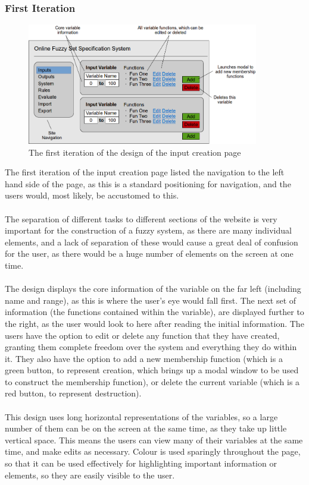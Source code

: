 \subsubsection{First Iteration}
\begin{figure}[ht!]
\begin{center}
\includegraphics[width=0.9\textwidth]{images/firstItInputs}
\end{center}
\vspace{-2mm}
\caption{The first iteration of the design of the input creation page}
\label{fig:design-firstIterationInputs}
\vspace{-1mm}
\end{figure}
\noindent 
The first iteration of the input creation page listed the navigation to the left hand side of the page, as this is a standard positioning for navigation, and the users would, most likely, be accustomed to this. \ \\
\ \\
The separation of different tasks to different sections of the website is very important for the construction of a fuzzy system, as there are many individual elements, and a lack of separation of these would cause a great deal of confusion for the user, as there would be a huge number of elements on the screen at one time.\ \\
\ \\
The design displays the core information of the variable on the far left (including name and range), as this is where the user's eye would fall first. The next set of information (the functions contained within the variable), are displayed further to the right, as the user would look to here after reading the initial information. The users have the option to edit or delete any function that they have created, granting them complete freedom over the system and everything they do within it. They also have the option to add a new membership function (which is a green button, to represent creation, which brings up a modal window to be used to construct the membership function), or delete the current variable (which is a red button, to represent destruction). \ \\
\ \\
This design uses long horizontal representations of the variables, so a large number of them can be on the screen at the same time, as they take up little vertical space. This means the users can view many of their variables at the same time, and make edits as necessary. Colour is used sparingly throughout the page, so that it can be used effectively for highlighting important information or elements, so they are easily visible to the user.

